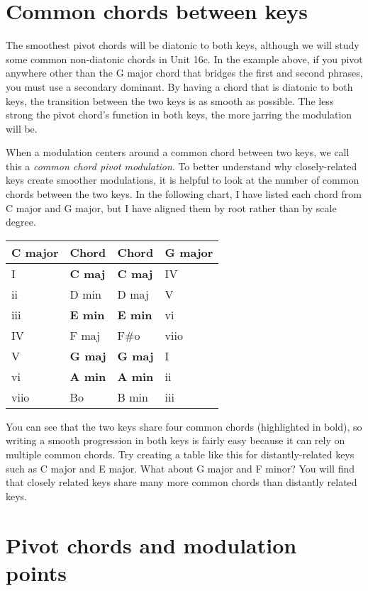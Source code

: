 \documentclass{book}
\begin{document}
\hypertarget{common-chords-between-keys}{%
\section{Common chords between keys}\label{common-chords-between-keys}}

The smoothest pivot chords will be diatonic to both keys, although we will
study some common non-diatonic chords in Unit 16c. In the example above, if
you pivot anywhere other than the G major chord that bridges the first and
second phrases, you must use a secondary dominant. By having a chord that is
diatonic to both keys, the transition between the two keys is as smooth as
possible. The less strong the pivot chord's function in both keys, the more
jarring the modulation will be.

When a modulation centers around a common chord between two keys, we call this
a \emph{common chord pivot modulation}. To better understand why
closely-related keys create smoother modulations, it is helpful to look at the
number of common chords between the two keys. In the following chart, I have
listed each chord from C major and G major, but I have aligned them by root
rather than by scale degree.

\begin{longtable}[]{@{}llll@{}}
\toprule
C major & Chord & Chord & G major \\
\midrule
\endhead
I & \textbf{C maj} & \textbf{C maj} & IV \\
ii & D min & D maj & V \\
iii & \textbf{E min} & \textbf{E min} & vi \\
IV & F maj & F\#o & viio \\
V & \textbf{G maj} & \textbf{G maj} & I \\
vi & \textbf{A min} & \textbf{A min} & ii \\
viio & Bo & B min & iii \\
\bottomrule
\end{longtable}

You can see that the two keys share four common chords (highlighted in bold),
so writing a smooth progression in both keys is fairly easy because it can
rely on multiple common chords. Try creating a table like this for
distantly-related keys such as C major and E major. What about G major and F
minor? You will find that closely related keys share many more common chords
than distantly related keys.

\hypertarget{pivot-chords-and-modulation-points}{%
\section{Pivot chords and modulation
points}\label{pivot-chords-and-modulation-points}}
\end{document}
